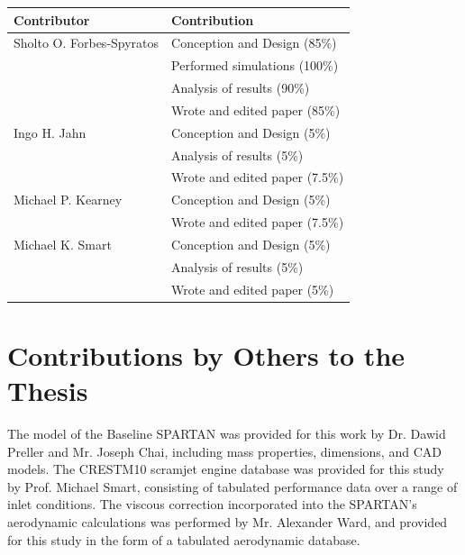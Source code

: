 \begin{center}
  \begin{tabular}{ll}
    \toprule
    Contributor   & Contribution \\
    \midrule
    Sholto O. Forbes-Spyratos             
                                  & Conception and Design (85\%)\\
                                  & Performed simulations (100\%)\\
                                  & Analysis of results (90\%)\\
                                  & Wrote and edited paper (85\%)\\
    \midrule
    Ingo H. Jahn            
                                  & Conception and Design (5\%)\\
                                  & Analysis of results (5\%)\\
                                  & Wrote and edited paper (7.5\%)\\
                                  
        \midrule
        Michael P. Kearney            
								      & Conception and Design (5\%)\\
								      & Wrote and edited paper (7.5\%)\\                       

    \midrule
    Michael K. Smart              
                                  & Conception and Design (5\%)\\
                                  & Analysis of results (5\%)\\
                                  & Wrote and edited paper (5\%)\\
    \bottomrule
  \end{tabular}
\end{center}



\section*{Contributions by Others to the Thesis}

The model of the Baseline SPARTAN was provided for this work by Dr. Dawid Preller and Mr. Joseph Chai, including mass properties, dimensions, and CAD models. The CRESTM10 scramjet engine database was provided for this study by Prof. Michael Smart, consisting of tabulated performance data over a range of inlet conditions. The viscous correction incorporated into the SPARTAN's aerodynamic calculations was performed by Mr. Alexander Ward, and provided for this study in the form of a tabulated aerodynamic database. 

